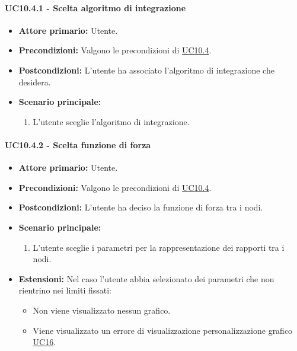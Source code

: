 \paragraph{UC10.4.1 - Scelta algoritmo di integrazione}
\label{sec:UC10.4.1}
    \begin{itemize}
        \item \textbf{Attore primario:} Utente.
        \item \textbf{Precondizioni:} Valgono le precondizioni di \hyperref[sec:UC10.4]{UC10.4}.
	    \item \textbf{Postcondizioni:} L'utente ha associato l'algoritmo di integrazione che desidera.
	    \item \textbf{Scenario principale:} 
	    \begin{enumerate}
	    		\item L'utente sceglie l'algoritmo di integrazione.
		\end{enumerate}
    \end{itemize}
    
\paragraph{UC10.4.2 - Scelta funzione di forza}
\label{sec:UC10.4.2}
    \begin{itemize}
        \item \textbf{Attore primario:} Utente.
        \item \textbf{Precondizioni:} Valgono le precondizioni di \hyperref[sec:UC10.4]{UC10.4}.
	    \item \textbf{Postcondizioni:} L'utente ha deciso la funzione di forza tra i nodi.
	    \item \textbf{Scenario principale:} 
	    \begin{enumerate}
	    		\item L'utente sceglie i parametri per la rappresentazione dei rapporti tra i nodi.
		\end{enumerate}
	    \item \textbf{Estensioni:} Nel caso l'utente abbia selezionato dei parametri che non rientrino nei limiti fissati:
              \begin{itemize}
                  \item Non viene visualizzato nessun grafico.
                  \item Viene visualizzato un errore di visualizzazione personalizzazione grafico \hyperref[sec:UC16 - Errore di personalizzazione]{UC16}.
              \end{itemize}
    \end{itemize}


